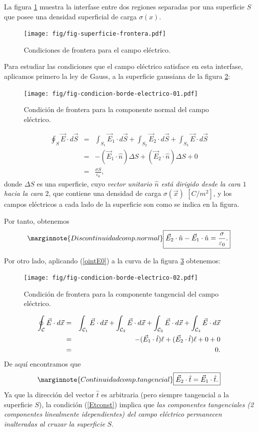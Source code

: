 La figura \ref{DSCE1} muestra la interfase entre dos regiones separadas por una
superficie $S$ que posee una densidad superficial de carga $\sigma(x)$.
\begin{figure}[!h]
\centerline{\texttt{[image: fig/fig-superficie-frontera.pdf]}}
\caption{Condiciones de frontera para el campo eléctrico.}
\label{DSCE1}
\end{figure}
Para estudiar las condiciones que el campo eléctrico satisface en esta
interfase, aplicamos primero la ley de Gauss, a la superficie gaussiana de la
figura \ref{DSCE2}:
\begin{figure}[!h]
\centerline{\texttt{[image: fig/fig-condicion-borde-electrico-01.pdf]}}
\caption{Condición de frontera para la componente normal del campo eléctrico.}
\label{DSCE2}
\end{figure}
\begin{eqnarray}
\oint_{S} \vec{E}\cdot d\vec{S}&=&\int_{S_1}
\vec{E}_1\cdot d\vec{S}+\int_{S_2} \vec{E}_2 \cdot d\vec{S}+\int_{S_3}
\vec{E}\cdot d\vec{S}\\
&=& -(\vec{E}_1\cdot\hat{n})\Delta S+(\vec{E}_2\cdot\hat{n})\Delta S+0\\
&=& \frac{\sigma S}{\varepsilon_0},
\end{eqnarray}
donde $\Delta S$ es una superficie, cuyo \textit{vector unitario $\hat{n}$ está dirigido
desde la cara $1$ hacia la cara $2$}, que contiene una densidad de carga
$\sigma(\vec{x})$ $\left[ C/m^2\right]  $, y los campos eléctricos a
cada lado de la superficie son como se indica en la figura.

Por tanto, obtenemos
\begin{equation}\marginnote{Discontinuidad comp. normal}
\boxed{\vec{E}_2\cdot\hat{n}-\vec{E}_1\cdot\hat{n}=\frac{\sigma}
{\varepsilon_0}.}\label{saltoEn}
\end{equation}

Por otro lado, aplicando (\ref{ointE0}) a la curva de la figura \ref{DSCE3} obtenemos:
\begin{figure}[!h]
\centerline{\texttt{[image: fig/fig-condicion-borde-electrico-02.pdf]}}
\caption{Condición de frontera para la componente tangencial del campo eléctrico.}
\label{DSCE3}
\end{figure}
\begin{eqnarray}
 \oint_{\cal C} \vec{E}\cdot d\vec{x}&=&\int_{{\cal C}_1} \vec{E}\cdot
d\vec{x}+\int_{{\cal C}_2} \vec{E}\cdot d\vec{x}+\int_{{\cal C}_3}
\vec{E}\cdot d\vec{x}+\int_{{\cal C}_4} \vec{E}\cdot d\vec{x} \\
&=& -(\vec{E}_1\cdot\hat{t})\ell +(\vec{E}_2\cdot\hat{t})\ell +0+0 \\
&=& 0.
\end{eqnarray}
De aquí encontramos que
\begin{equation}\marginnote{Continuidad comp. tangencial}
 \boxed{\vec{E}_2\cdot\hat{t}=\vec{E}_1\cdot\hat{t}.} \label{Etconst}
\end{equation}
Ya que la dirección del vector $\hat{t}$ es arbitraria (pero siempre
tangencial a la superficie $S$), la condición (\ref{Etconst}) implica que
 \textit{las componentes tangenciales (2 componentes linealmente idependientes) del campo eléctrico permanecen inalteradas
al cruzar la superficie} $S$.

